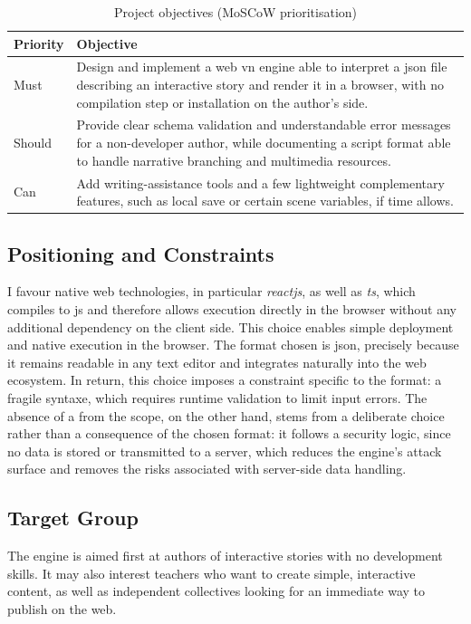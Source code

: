 \begin{table}[H]
    \centering
    \caption{Project objectives (MoSCoW prioritisation)}
    \renewcommand{\arraystretch}{1.4}
    \begin{tabular}{p{1.8cm} p{11.5cm}}
        \hline
        \textbf{Priority} & \textbf{Objective} \\
        \hline
        Must & Design and implement a web \gls{vn} engine able to interpret a \gls{json} file describing an interactive story and render it in a browser, with no compilation step or installation on the author's side. \\
        \addlinespace
        Should & Provide clear \gls{schema} validation and understandable error messages for a non-developer author, while documenting a script format able to handle narrative branching and multimedia resources. \\
        \addlinespace
        Can & Add writing-assistance tools and a few lightweight complementary features, such as local save or certain scene variables, if time allows. \\
        \hline
    \end{tabular}
    \label{tab:objectifs_moscow_intro}
\end{table}

\subsection{Positioning and Constraints}
I favour native web technologies, in particular \textit{\gls{reactjs}}, as well as \textit{\gls{ts}}, which compiles to \gls{js} and therefore allows execution directly in the browser without any additional dependency on the client side. This choice enables simple deployment and native execution in the browser. The format chosen is \gls{json}, precisely because it remains readable in any text editor and integrates naturally into the web ecosystem. In return, this choice imposes a constraint specific to the format: a fragile \gls{syntaxe}, which requires runtime validation to limit input errors. The absence of a  from the scope, on the other hand, stems from a deliberate choice rather than a consequence of the chosen format: it follows a security logic, since no data is stored or transmitted to a server, which reduces the engine's attack surface and removes the risks associated with server-side data handling.

\subsection{Target Group}
The engine is aimed first at authors of interactive stories with no development skills. It may also interest teachers who want to create simple, interactive content, as well as independent collectives looking for an immediate way to publish on the web.

